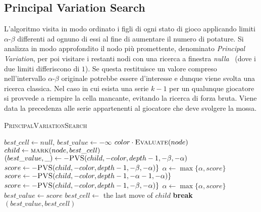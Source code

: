 \documentclass{article}
\begin{document}
\subsection{Principal Variation Search}

L'algoritmo visita in modo ordinato i figli di ogni stato di gioco applicando
limiti $\alpha$-$\beta$ differenti ad ognuno di essi al fine di aumentare il numero di potature.
Si analizza in modo approfondito il nodo pi\`u promettente, denominato \emph{Principal
Variation}, per poi visitare i restanti nodi con una ricerca a finestra \emph{nulla}~\cite{scout}
(dove i due limiti differiscono di $1$). Se questa restituisce un valore compreso
nell'intervallo $\alpha$-$\beta$ originale potrebbe essere d'interesse e dunque viene
svolta una ricerca classica.
Nel caso in cui esista una serie $k-1$ per un qualunque giocatore si provvede a
riempire la cella mancante, evitando la ricerca di forza bruta. Viene data la
precedenza alle serie appartenenti al giocatore che deve svolgere la mossa.

\begin{algorithm}[H]
  \caption{\textsc{PrincipalVariationSearch}}
  \label{alg:pvs}
  \begin{algorithmic}[0]
      \State $best\_cell \gets null, \, best\_value \gets -\infty$
        \State \Return $color \cdot \Call{Evaluate}{node}$
        \State $child \gets \Call{mark}{node, best\_cell}$
        \State $(best\_value, \_) \gets -\Call{PVS}{child, -color, depth-1, -\beta, -\alpha}$
      \Else
            \State $score \gets -\Call{PVS}{child, -color, depth-1, -\beta, -\alpha}\}$
            \State $\alpha \gets \max\{\alpha, score\}$
          \Else
            \State $score \gets -\Call{PVS}{child, -color, depth-1, -\alpha-1, -\alpha}\}$
              \State $score \gets -\Call{PVS}{child, -color, depth-1, -\beta, -\alpha}\}$
              \State $\alpha \gets \max\{\alpha, score\}$
            \EndIf
          \EndIf
            \State $best\_value \gets score$
            \State $best\_cell \gets $ the last move of $child$
          \EndIf
            \State \textbf{break}
          \EndIf
        \EndFor
      \EndIf
      \State \Return $(best\_value, best\_cell)$
    \EndProcedure
  \end{algorithmic}
\end{algorithm}
\end{document}
